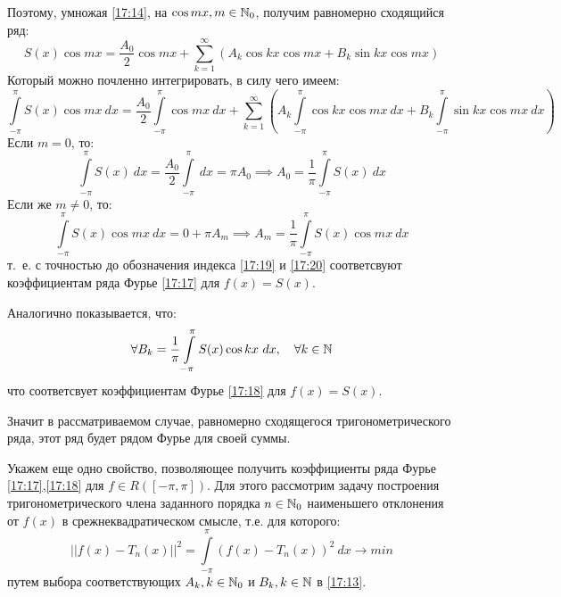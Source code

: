 \documentclass[../../main.tex]{subfiles}
\begin{document}
Поэтому, умножая \eqref{17:14}, на $\cos{mx}, m \in \mathbb{N}_0$, получим равномерно сходящийся ряд:
\[  S(x) \cos{mx} =  \frac{A_0}{2} \cos{mx} + \sum_{k=1}^{\infty}  \left( A_k \cos{kx} \cos{mx} + B_k \sin{kx} \cos{mx} \right)     \]
Который можно почленно интегрировать, в силу чего имеем:
\[  \int\limits_{-\pi}^{\pi} S(x) \cos{mx} \ dx = \frac{A_0}{2}\int\limits_{-\pi}^{\pi} \cos{mx} \ dx + \sum_{k=1}^{\infty}  \left( A_k \int\limits_{-\pi}^{\pi} \cos{kx} \cos{mx} \ dx + B_k \int\limits_{-\pi}^{\pi} \sin{kx} \cos{mx} \ dx \right)  \]
Если $m=0$, то:
\begin{equation}
\label{17:19}
\int\limits_{-\pi}^{\pi} S(x) \ dx = \frac{A_0}{2}\int\limits_{-\pi}^{\pi} \ dx  = \pi A_0  \implies A_0 = \frac{1}{\pi} \int\limits_{-\pi}^{\pi} S(x) \ dx
\end{equation}
Если же $m \ne 0$, то:
\begin{equation}
\label{17:20}
\int\limits_{-\pi}^{\pi} S(x) \cos{mx} \ dx = 0 + \pi A_m \implies A_m = \frac{1}{\pi} \int\limits_{-\pi}^{\pi} S(x) \cos{mx} \ dx
\end{equation}
т.~е. с точностью до обозначения индекса \eqref{17:19} и \eqref{17:20} соответсвуют коэффициентам ряда Фурье \eqref{17:17} для $f(x) = S(x)$.

Аналогично показывается, что:
\begin{equation}
\label{17:21}
\forall B_k = \frac{1}{\pi} \int\limits_{-\pi}^{\pi} S(x) \cos{kx} \ dx, \quad \forall k \in \mathbb{N}
\end{equation}
что соответсвует коэффициентам Фурье \eqref{17:18} для $f(x) = S(x)$. 

Значит в рассматриваемом случае, равномерно сходящегося тригонометрического ряда, этот ряд будет рядом Фурье для своей суммы.

Укажем еще одно свойство, позволяющее получить коэффициенты ряда Фурье \eqref{17:17},\eqref{17:18} для $f \in R\left( \left[ -\pi,\pi\right]  \right).$ Для этого рассмотрим задачу построения тригонометрического члена заданного порядка $n \in \mathbb{N}_0$ наименьшего отклонения от $f(x)$ в срежнеквадратическом смысле, т.е. для которого:
\begin{equation}
\label{17:22}
\left|| f(x) -T_n(x) |\right| ^2 = \int \limits_{-\pi}^{\pi} \left( f(x) - T_n(x)\right)^2 \ dx \to min
\end{equation}
путем выбора соответствующих $A_k, k \in \mathbb{N}_0$ и $B_k, k \in \mathbb{N}$ в \eqref{17:13}.
\end{document}
